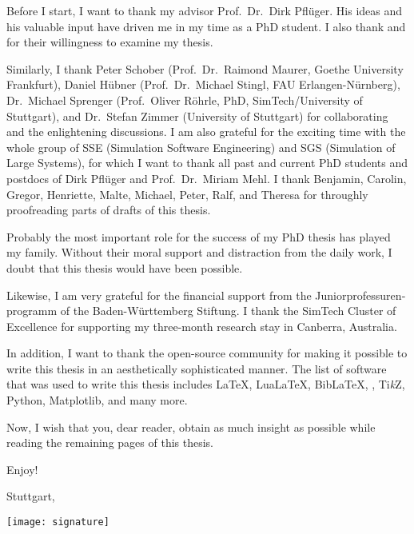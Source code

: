 
Before I start, I want to thank my advisor Prof.\ Dr.\ Dirk Pflüger.
His ideas and his valuable input have driven me in
my time as a PhD student.
I also thank \theexamineri{} and \theexaminerii{}
for their willingness to examine my thesis.

Similarly, I thank
Peter Schober
(Prof.\ Dr.\ Raimond Maurer, Goethe University Frankfurt),
Daniel Hübner
(Prof.\ Dr.\ Michael Stingl, FAU Erlangen-Nürnberg),
Dr.\ Michael Sprenger
(Prof.\ Oliver Röhrle, PhD, SimTech/University of Stuttgart), and
Dr.\ Stefan Zimmer
(University of Stuttgart) for
collaborating and the enlightening discussions.
I am also grateful for the exciting time with the whole group of
SSE (Simulation Software Engineering) and
SGS (Simulation of Large Systems),
for which I want to thank all past and current PhD students and postdocs of
Dirk Pflüger and Prof.\ Dr.\ Miriam Mehl.
I thank Benjamin, Carolin, Gregor, Henriette, Malte, Michael, Peter,
Ralf, and Theresa
for throughly proofreading parts of drafts of this thesis.

Probably the most important role for the success of my PhD thesis
has played my family.
Without their moral support and distraction from the daily work,
I doubt that this thesis would have been possible.

Likewise, I am very grateful for the financial support from
the \foreignlanguage{ngerman}{Juniorprofessurenprogramm} of the
\foreignlanguage{ngerman}{Baden-Württemberg Stiftung}.
I thank the SimTech Cluster of Excellence for supporting
my three-month research stay in Canberra, Australia.

In addition, I want to thank the open-source community for making it possible to
write this thesis in an aesthetically sophisticated manner.
The list of software that was used to write this thesis includes
\LaTeX, Lua\LaTeX, Bib\LaTeX,
\scalebox{0.9}{\KOMAScript}, Ti\emph{k}Z, Python, Matplotlib,
and many more.

\label{page:preface}
Now, I wish that you, dear reader, obtain as much insight as possible
while reading the remaining
 pages of this thesis.

Enjoy!

\vspace{1em}

\noindent
Stuttgart, \thedate

\vspace{0.5em}

\noindent
\texttt{[image: signature]}

\cleardoublepage
